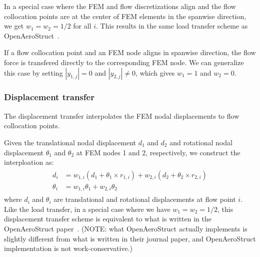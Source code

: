\documentclass[10pt]{article}
\begin{document}
In a special case where the FEM and flow discretizations align and the flow collocation points are at the center of FEM elements in the spanwise direction, we get $w_1=w_2 = 1/2$ for all $i$.
This results in the same load transfer scheme as OpenAeroStruct~\cite{Jasa2018a}.

If a flow collocation point and an FEM node aligns in spanwise direction, the flow force is transfered directly to the corresponding FEM node.
We can generalize this case by setting $|y_{1, j}| = 0$ and $|y_{2, j}| \neq 0$, which gives $w_1 = 1$ and $w_2 = 0$.

\subsubsection{Displacement transfer}
The displacement transfer interpolates the FEM nodal displacements to flow collocation points.

Given the translational nodal displacement $d_1$ and $d_2$ and rotational nodal displacement $\theta_1$ and $\theta_2$ at FEM nodes 1 and 2, respectively, we construct the interploation as:
\begin{align}
\begin{aligned}
	d_i      &= w_{1,i} \left( d_1 + \theta_1 \times r_{1, i} \right) + w_{2,i} \left( d_2 + \theta_2 \times r_{2, i} \right)  \\
	\theta_i &= w_{1,i} \theta_1 + w_{2,i} \theta_2
\end{aligned}	
\end{align}
where $d_i$ and $\theta_i$ are translational and rotational displacements at flow point $i$.
Like the load transfer, in a special case where we have $w_1=w_2 = 1/2$, this displacement transfer scheme is equivalent to what is written in the OpenAeroStruct paper~\citep{Jasa2018a}.
(NOTE: what OpenAeroStruct actually implements is slightly different from what is written in their journal paper, and OpenAeroStruct implementation is not work-conservative.)
\end{document}
